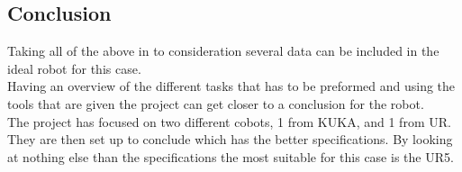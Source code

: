 \subsection{Conclusion}

Taking all of the above in to consideration several data can be included in the ideal robot for this case.\\
Having an overview of the different tasks that has to be preformed and using the tools that are given the project can get closer to a conclusion for the robot.\\
The project has focused on two different cobots, 1 from KUKA, and 1 from UR. They are then set up to conclude which has the better specifications. By looking at nothing else than the specifications the most suitable for this case is the UR5.\\

\newpage

